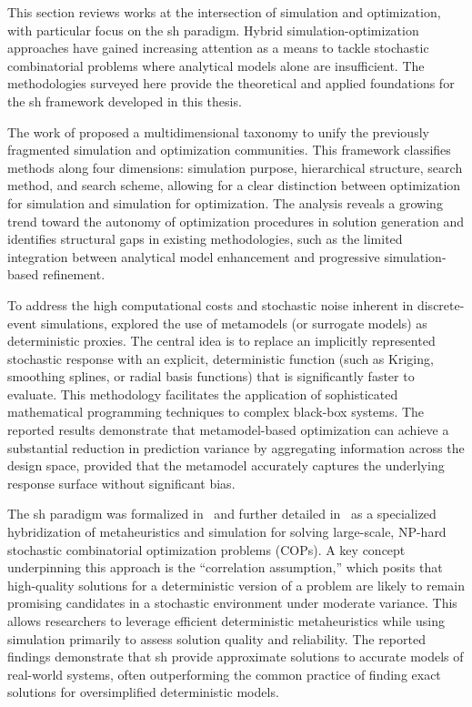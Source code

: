 This section reviews works at the intersection of simulation and optimization, with particular focus on the \gls{sh} paradigm. Hybrid simulation-optimization approaches have gained increasing attention as a means to tackle stochastic combinatorial problems where analytical models alone are insufficient. The methodologies surveyed here provide the theoretical and applied foundations for the \gls{sh} framework developed in this thesis.

The work of \cite{figueira2014hybrid} proposed a multidimensional taxonomy to unify the previously fragmented simulation and optimization communities. This framework classifies methods along four dimensions: simulation purpose, hierarchical structure, search method, and search scheme, allowing for a clear distinction between optimization for simulation and simulation for optimization. The analysis reveals a growing trend toward the autonomy of optimization procedures in solution generation and identifies structural gaps in existing methodologies, such as the limited integration between analytical model enhancement and progressive simulation-based refinement.

To address the high computational costs and stochastic noise inherent in discrete-event simulations, \cite{barton2006metamodel} explored the use of metamodels (or surrogate models) as deterministic proxies. The central idea is to replace an implicitly represented stochastic response with an explicit, deterministic function (such as Kriging, smoothing splines, or radial basis functions) that is significantly faster to evaluate. This methodology facilitates the application of sophisticated mathematical programming techniques to complex black-box systems. The reported results demonstrate that metamodel-based optimization can achieve a substantial reduction in prediction variance by aggregating information across the design space, provided that the metamodel accurately captures the underlying response surface without significant bias.

The \gls{sh} paradigm was formalized in~\cite{juan:2015} and further detailed in~\cite{juan:2022} as a specialized hybridization of metaheuristics and simulation for solving large-scale, NP-hard stochastic combinatorial optimization problems (COPs). A key concept underpinning this approach is the ``correlation assumption,'' which posits that high-quality solutions for a deterministic version of a problem are likely to remain promising candidates in a stochastic environment under moderate variance. This allows researchers to leverage efficient deterministic metaheuristics while using simulation primarily to assess solution quality and reliability. The reported findings demonstrate that \gls{sh} provide approximate solutions to accurate models of real-world systems, often outperforming the common practice of finding exact solutions for oversimplified deterministic models.


